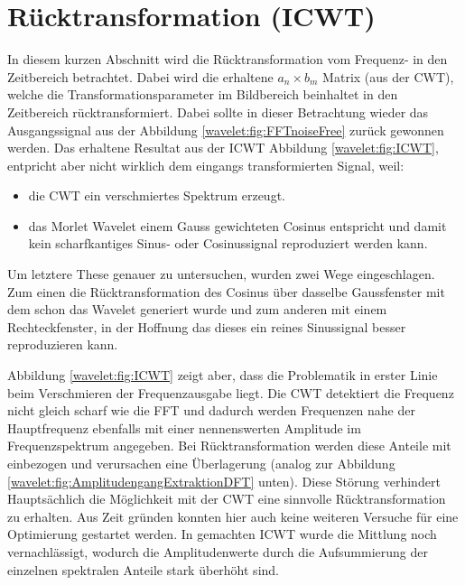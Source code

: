 %
%
%
%
\section{Rücktransformation (ICWT)
	\label{wavelets:section:teil5}}

In diesem kurzen Abschnitt wird die Rücktransformation vom Frequenz- in den Zeitbereich betrachtet. Dabei wird die erhaltene $a_n \times b_m$ Matrix (aus der CWT), welche die Transformationsparameter im Bildbereich beinhaltet in den Zeitbereich rücktransformiert. Dabei sollte in dieser Betrachtung wieder das Ausgangssignal aus der Abbildung \ref{wavelet:fig:FFTnoiseFree} zurück gewonnen werden.
Das erhaltene Resultat aus der ICWT Abbildung \ref{wavelet:fig:ICWT}, entpricht aber nicht wirklich dem eingangs transformierten Signal, weil:

\begin{itemize}
	\item die CWT ein verschmiertes Spektrum erzeugt.
	\item das Morlet Wavelet einem Gauss gewichteten Cosinus entspricht und damit kein scharfkantiges Sinus- oder Cosinussignal reproduziert werden kann.
\end{itemize}

Um letztere These genauer zu untersuchen, wurden zwei Wege eingeschlagen. Zum einen die Rücktransformation des Cosinus über dasselbe Gaussfenster mit dem schon das Wavelet generiert wurde und zum anderen mit einem Rechteckfenster, in der Hoffnung das dieses ein reines Sinussignal besser reproduzieren kann.

Abbildung \ref{wavelet:fig:ICWT} zeigt aber, dass die Problematik in erster Linie beim Verschmieren der Frequenzausgabe liegt. Die CWT detektiert die Frequenz nicht gleich scharf wie die FFT und dadurch werden Frequenzen nahe der Hauptfrequenz ebenfalls mit einer nennenswerten Amplitude im Frequenzspektrum angegeben. Bei Rücktransformation werden diese Anteile mit einbezogen und verursachen eine Überlagerung (analog zur Abbildung \ref{wavelet:fig:AmplitudengangExtraktionDFT} unten). Diese Störung verhindert Hauptsächlich die Möglichkeit mit der CWT eine sinnvolle Rücktransformation zu erhalten. Aus Zeit gründen konnten hier auch keine weiteren Versuche für eine Optimierung gestartet werden. In gemachten ICWT wurde die Mittlung noch vernachlässigt, wodurch die Amplitudenwerte durch die Aufsummierung der einzelnen spektralen Anteile stark überhöht sind.

